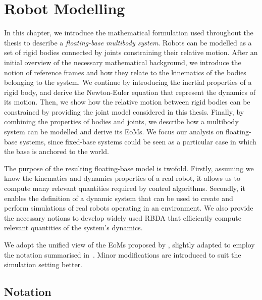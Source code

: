 \acresetall
\chapter{Robot Modelling}
\label{ch:robot_modelling}

In this chapter, we introduce the mathematical formulation used throughout the thesis to describe a \emph{floating-base multibody system}.
Robots can be modelled as a set of rigid bodies connected by joints constraining their relative motion.
After an initial overview of the necessary mathematical background, we introduce the notion of reference frames and how they relate to the kinematics of the bodies belonging to the system.
We continue by introducing the inertial properties of a rigid body, and derive the Newton-Euler equation that represent the dynamics of its motion.
Then, we show how the relative motion between rigid bodies can be constrained by providing the joint model considered in this thesis.
Finally, by combining the properties of bodies and joints, we describe how a multibody system can be modelled and derive its \aclp{EoM}.
We focus our analysis on floating-base systems, since fixed-base systems could be seen as a particular case in which the base is anchored to the world.

The purpose of the resulting floating-base model is twofold.
Firstly, assuming we know the kinematics and dynamics properties of a real robot, it allows us to compute many relevant quantities required by control algorithms.
Secondly, it enables the definition of a dynamic system that can be used to create and perform simulations of real robots operating in an environment.
We also provide the necessary notions to develop widely used \ac{RBDA} that efficiently compute relevant quantities of the system's dynamics.

We adopt the unified view of the \acp{EoM} proposed by \textcite{traversaro_unied_2017}, slightly adapted to employ the notation summarised in~\textcite{traversaro_multibody_2019}.
Minor modifications are introduced to suit the simulation setting better.

\section{Notation}

